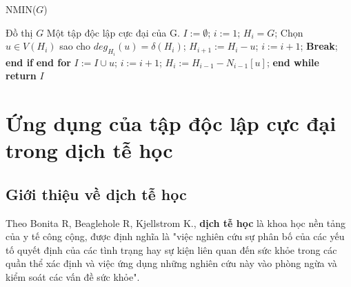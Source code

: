 \documentclass[14pt, oneside, a4paper, openany]{scrartcl}
\begin{document}
\begin{algorithm}
	\caption{NMIN($G$)}\label{NMIN}
	\begin{algorithmic}[1]
		\INPUT Đồ thị $G$
		\OUTPUT Một tập độc lập cực đại của G.
		\State $I := \emptyset$; $i:=1$; $H_i=G$;
		\State Chọn $u \in V(H_i)$  sao cho $deg_{H_i}(u) = \delta(H_i)$;
				\State $H_{i+1} := H_i - u$; $i := i+1$; \textbf{Break};
			\EndIf
			\State \textbf{end if}
		\EndFor
		\State \textbf{end for}				
		\State $I := I \cup {u}$; $i := i+1$; $H_i := H_{i-1} - N_{i-1}[u]$;
		\EndWhile
	\State \textbf{end while}
	\State \textbf{return} $I$
	\end{algorithmic}
\end{algorithm}


\newpage
\section{Ứng dụng của tập độc lập cực đại trong dịch tễ học}
\subsection{Giới thiệu về dịch tễ học}
Theo Bonita R, Beaglehole R, Kjellstrom K.\cite{BasicEpid}, \textbf{dịch tễ học}   là khoa học nền tảng của y tế công cộng, được định nghĩa là "việc nghiên cứu sự phân bố của các yếu tố quyết định của các tình trạng hay sự kiện liên quan đến sức khỏe trong các quần thể xác định và việc ứng dụng những nghiên cứu này vào phòng ngừa và kiểm soát các vấn đề sức khỏe". 
\end{document}
